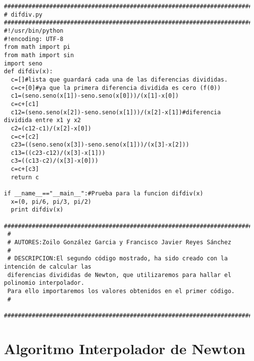 \begin{center}
\begin{footnotesize}
\begin{verbatim}
###################################################################################
# difdiv.py
###################################################################################
#!/usr/bin/python
#!encoding: UTF-8
from math import pi
from math import sin
import seno
def difdiv(x):
  c=[]#lista que guardará cada una de las diferencias divididas.
  c=c+[0]#ya que la primera diferencia dividida es cero (f(0))
  c1=(seno.seno(x[1])-seno.seno(x[0]))/(x[1]-x[0])
  c=c+[c1]
  c12=(seno.seno(x[2])-seno.seno(x[1]))/(x[2]-x[1])#diferencia dividida entre x1 y x2
  c2=(c12-c1)/(x[2]-x[0])
  c=c+[c2]
  c23=((seno.seno(x[3])-seno.seno(x[1]))/(x[3]-x[2]))
  c13=((c23-c12)/(x[3]-x[1]))
  c3=((c13-c2)/(x[3]-x[0]))
  c=c+[c3]
  return c
  
if __name__=="__main__":#Prueba para la funcion difdiv(x)
  x=(0, pi/6, pi/3, pi/2)
  print difdiv(x)
 ###################################################################################
 #
 # AUTORES:Zoilo González Garcia y Francisco Javier Reyes Sánchez
 #
 # DESCRIPCION:El segundo código mostrado, ha sido creado con la intención de calcular las 
 diferencias divididas de Newton, que utilizaremos para hallar el polinomio interpolador.
 Para ello importaremos los valores obtenidos en el primer código.
 #
 ##################################################################################
\end{verbatim}
\end{footnotesize}
\end{center}

\section{Algoritmo Interpolador de Newton}
\label{Apendice3:ZZZ}

